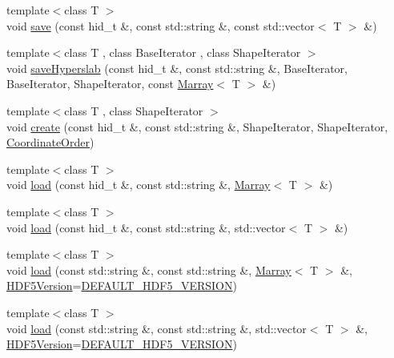 \begin{DoxyCompactItemize}
\item 
{\footnotesize template$<$class T $>$ }\\void \hyperlink{namespaceandres_1_1hdf5_a541f5c1613746f236ecc7e0035fa8919}{save} (const hid\+\_\+t \&, const std\+::string \&, const std\+::vector$<$ T $>$ \&)
\item 
{\footnotesize template$<$class T , class Base\+Iterator , class Shape\+Iterator $>$ }\\void \hyperlink{namespaceandres_1_1hdf5_a8b3c6fd3570f7452b1507bf5cf48dfc5}{save\+Hyperslab} (const hid\+\_\+t \&, const std\+::string \&, Base\+Iterator, Base\+Iterator, Shape\+Iterator, const \hyperlink{classandres_1_1Marray}{Marray}$<$ T $>$ \&)
\item 
{\footnotesize template$<$class T , class Shape\+Iterator $>$ }\\void \hyperlink{namespaceandres_1_1hdf5_ad266faeb7371428b1bf018d4ddfec60d}{create} (const hid\+\_\+t \&, const std\+::string \&, Shape\+Iterator, Shape\+Iterator, \hyperlink{namespaceandres_a2ac8b7aa89d44e8188a7c0ba50f4306b}{Coordinate\+Order})
\item 
{\footnotesize template$<$class T $>$ }\\void \hyperlink{namespaceandres_1_1hdf5_ad5975e294df6102c312f69cd69e43d60}{load} (const hid\+\_\+t \&, const std\+::string \&, \hyperlink{classandres_1_1Marray}{Marray}$<$ T $>$ \&)
\item 
{\footnotesize template$<$class T $>$ }\\void \hyperlink{namespaceandres_1_1hdf5_a2ada1d6f4dc33d14090bad2a90d4d1a6}{load} (const hid\+\_\+t \&, const std\+::string \&, std\+::vector$<$ T $>$ \&)
\item 
{\footnotesize template$<$class T $>$ }\\void \hyperlink{namespaceandres_1_1hdf5_aecef33e8f815adf3e28bb387e246ebc8}{load} (const std\+::string \&, const std\+::string \&, \hyperlink{classandres_1_1Marray}{Marray}$<$ T $>$ \&, \hyperlink{namespaceandres_1_1hdf5_ad5194a7b8773d3776e8dfc068f58f41b}{H\+D\+F5\+Version}=\hyperlink{namespaceandres_1_1hdf5_ad5194a7b8773d3776e8dfc068f58f41baf4fdc18c306e5d07105ad62a1cf6fa93}{D\+E\+F\+A\+U\+L\+T\+\_\+\+H\+D\+F5\+\_\+\+V\+E\+R\+S\+I\+ON})
\item 
{\footnotesize template$<$class T $>$ }\\void \hyperlink{namespaceandres_1_1hdf5_a1efbca2cf84e0a2076dd02b98a96b65b}{load} (const std\+::string \&, const std\+::string \&, std\+::vector$<$ T $>$ \&, \hyperlink{namespaceandres_1_1hdf5_ad5194a7b8773d3776e8dfc068f58f41b}{H\+D\+F5\+Version}=\hyperlink{namespaceandres_1_1hdf5_ad5194a7b8773d3776e8dfc068f58f41baf4fdc18c306e5d07105ad62a1cf6fa93}{D\+E\+F\+A\+U\+L\+T\+\_\+\+H\+D\+F5\+\_\+\+V\+E\+R\+S\+I\+ON})

\end{DoxyCompactItemize}
